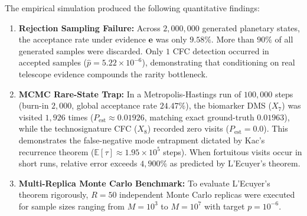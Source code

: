 The empirical simulation produced the following quantitative findings:
\begin{enumerate}
    \item \textbf{Rejection Sampling Failure:} Across $2,000,000$ generated planetary states, the acceptance rate under evidence $\mathbf{e}$ was only $9.58\%$. More than $90\%$ of all generated samples were discarded. Only $1$ CFC detection occurred in accepted samples ($\hat{p} = 5.22 \times 10^{-6}$), demonstrating that conditioning on real telescope evidence compounds the rarity bottleneck.
    \item \textbf{MCMC Rare-State Trap:} In a Metropolis-Hastings run of $100,000$ steps (burn-in $2,000$, global acceptance rate $24.47\%$), the biomarker DMS ($X_7$) was visited $1,926$ times ($P_{\mathrm{est}} \approx 0.01926$, matching exact ground-truth $0.01963$), while the technosignature CFC ($X_8$) recorded zero visits ($P_{\mathrm{est}} = 0.0$). This demonstrates the false-negative mode entrapment dictated by Kac's recurrence theorem ($\mathbb{E}[\tau] \approx 1.95 \times 10^5$ steps). When fortuitous visits occur in short runs, relative error exceeds $4,900\%$ as predicted by L'Ecuyer's theorem.
    \item \textbf{Multi-Replica Monte Carlo Benchmark:} To evaluate L'Ecuyer's theorem rigorously, $R = 50$ independent Monte Carlo replicas were executed for sample sizes ranging from $M = 10^3$ to $M = 10^7$ with target $p = 10^{-6}$.
\end{enumerate}

